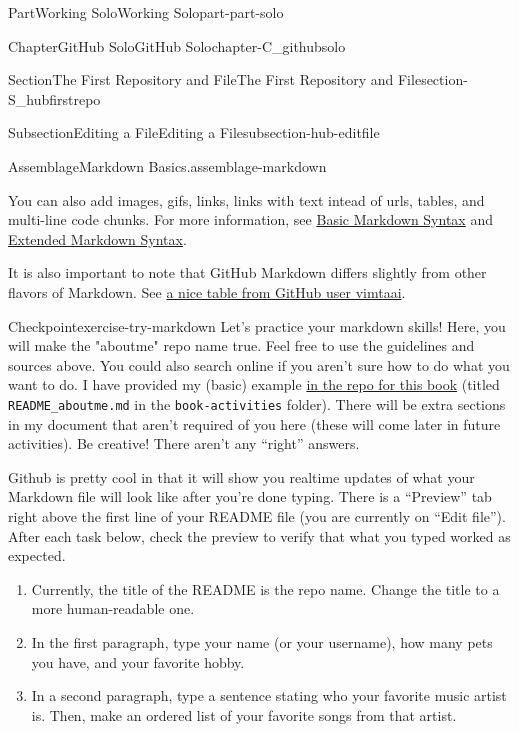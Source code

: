 \documentclass[twoside,10pt,]{book}
\newcommand{\mono}[1]{\texttt{#1}}
\begin{document}
\begin{partptx}{Part}{Working Solo}{}{Working Solo}{}{}{part-part-solo}
\begin{chapterptx}{Chapter}{GitHub Solo}{}{GitHub Solo}{}{}{chapter-C_githubsolo}
\begin{sectionptx}{Section}{The First Repository and File}{}{The First Repository and File}{}{}{section-S_hubfirstrepo}
\begin{subsectionptx}{Subsection}{Editing a File}{}{Editing a File}{}{}{subsection-hub-editfile}
\begin{assemblage}{Assemblage}{Markdown Basics.}{assemblage-markdown}
\begin{itemize}[label=\textbullet]
\end{itemize}
You can also add images, gifs, links, links with text intead of urls, tables, and multi-line code chunks. For more information, see \href{https://www.markdownguide.org/basic-syntax/}{Basic Markdown Syntax}\footnotemark{} and \href{https://www.markdownguide.org/extended-syntax/}{Extended Markdown Syntax}\footnotemark{}.%
\par
It is also important to note that GitHub Markdown differs slightly from other flavors of Markdown. See \href{https://gist.github.com/vimtaai/99f8c89e7d3d02a362117284684baa0f}{a nice table from GitHub user vimtaai}\footnotemark{}.%
\end{assemblage}
%
%
%
\begin{inlineexercise}{Checkpoint}{}{exercise-try-markdown}%
%
Let's practice your markdown skills! Here, you will make the "aboutme" repo name true. Feel free to use the guidelines and sources above. You could also search online if you aren't sure how to do what you want to do. I have provided my (basic) example \href{https://github.com/ian-curtis/gitstarted}{in the repo for this book}\footnotemark{} (titled \mono{README\_aboutme.md} in the \mono{book-activities} folder). There will be extra sections in my document that aren't required of you here (these will come later in future activities). Be creative! There aren't any ``right'' answers.%
\par
Github is pretty cool in that it will show you realtime updates of what your Markdown file will look like after you're done typing. There is a ``Preview'' tab right above the first line of your README file (you are currently on ``Edit file''). After each task below, check the preview to verify that what you typed worked as expected.%
\begin{enumerate}[font=\bfseries,label=(\alph*),ref=\alph*]%
\item{}Currently, the title of the README is the repo name. Change the title to a more human-readable one.%
\item{}In the first paragraph, type your name (or your username), how many pets you have, and your favorite hobby.%
\item{}In a second paragraph, type a sentence stating who your favorite music artist is. Then, make an ordered list of your favorite songs from that artist.%

\end{enumerate}
\end{inlineexercise}
\end{subsectionptx}
\end{sectionptx}
\end{chapterptx}
\end{partptx}
\end{document}
